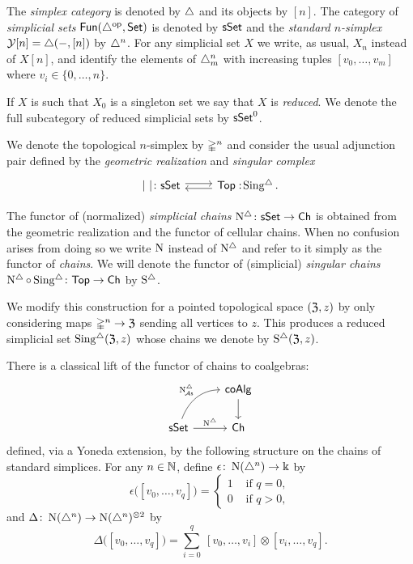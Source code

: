 The \textit{simplex category} is denoted by $\triangle$ and its objects by $[n]$.
The category of \textit{simplicial sets} $\mathsf{Fun}(\triangle^{\mathrm{op}}, \mathsf{Set})$ is denoted by $\mathsf{sSet}$ and the \textit{standard $n$-simplex} $\operatorname{\mathcal{Y}} [n] = \triangle(-, [n])$ by $\triangle^n$.
For any simplicial set $X$ we write, as usual, $X_n$ instead of $X [n]$, and identify the elements of $\triangle^n_m$ with increasing tuples $[v_0, \dots, v_m]$ where $v_i \in \{0, \dots, n\}$.

If $X$ is such that $X_0$ is a singleton set we say that $X$ is \textit{reduced}.
We denote the full subcategory of reduced simplicial sets by $\mathsf{sSet}^0$.

We denote the topological $n$-simplex by $\mathbb{\Delta}^{n}$ and consider the usual adjunction pair defined by the \textit{geometric realization} and \textit{singular complex}
\[
\begin{tikzcd}
	\bars{\ } \colon \sSet  \arrow[r, shift left=.5ex] &
	\Top :\! \sSing. \arrow[l, shift left=.5ex]
\end{tikzcd}
\]

The functor of (normalized) \textit{simplicial chains} $\operatorname{N^{\triangle}} \colon \mathsf{sSet} \to \mathsf{Ch}$ is obtained from the geometric realization and the functor of cellular chains.
When no confusion arises from doing so we write $\operatorname{N}$ instead of $\operatorname{N^{\triangle}}$ and refer to it simply as the functor of \textit{chains}.
We will denote the functor of (simplicial) \textit{singular chains} $\operatorname{N^{\triangle}} \circ \operatorname{Sing^{\triangle}} \colon \mathsf{Top} \to \mathsf{Ch}$ by $\operatorname{S^{\triangle}}$.

We modify this construction for a pointed topological space $(\mathfrak{Z},z)$ by only considering maps $\mathbb{\Delta}^n \to \mathfrak{Z}$ sending all vertices to $z$.
This produces a reduced simplicial set $\operatorname{Sing^{\triangle}}(\mathfrak{Z},z)$ whose chains we denote by $\operatorname{S^{\triangle}}(\mathfrak{Z},z)$.

There is a classical lift of the functor of chains to coalgebras:
\[
\begin{tikzcd}
	& \coAlg \arrow[d] \\
	\sSet \arrow[r, "\schains"] \arrow[ur, "\schainsA", out=70, in=180] & \Ch
\end{tikzcd}
\]
defined, via a Yoneda extension, by the following structure on the chains of standard simplices.
For any $n \in \mathbb{N}$, define $\epsilon \colon \operatorname{N}(\triangle^n) \to \Bbbk$ by
\[
\epsilon \big( [v_0, \dots, v_q] \big) = \begin{cases} 1 & \text{ if } q = 0, \\ 0 & \text{ if } q>0, \end{cases}
\]
and $\Delta \colon \operatorname{N}(\triangle^n) \to \operatorname{N}(\triangle^n)^{\otimes2}$ by
\[
\Delta \big( [v_0, \dots, v_q] \big) = \sum_{i=0}^q \ [v_0, \dots, v_i] \otimes [v_i, \dots, v_q].
\]

